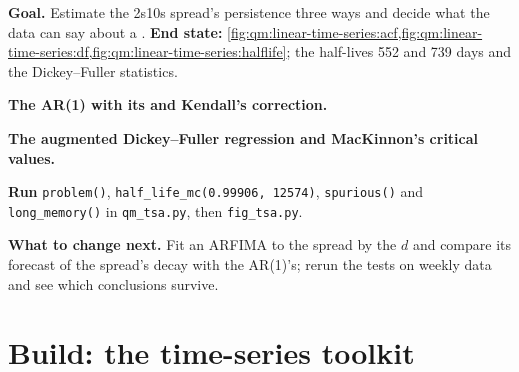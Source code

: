 \begin{tutorial}
\textbf{Goal.} Estimate the 2s10s spread's persistence three ways and decide what the data can say about a .
\textbf{End state:} \cref{fig:qm:linear-time-series:acf,fig:qm:linear-time-series:df,fig:qm:linear-time-series:halflife}; the half-lives 552 and 739 days and the
Dickey--Fuller statistics.
\begin{tutsteps}
\item \textbf{The AR(1) with its  and Kendall's correction.}
\label{lst:qm:linear-time-series:ar1}
\item \textbf{The augmented Dickey--Fuller regression and MacKinnon's critical values.}
\label{lst:qm:linear-time-series:adf}
\item \textbf{Run} \texttt{problem()}, \texttt{half\_life\_mc(0.99906, 12574)}, \texttt{spurious()} and \texttt{long\_memory()} in \texttt{qm\_tsa.py}, then
\texttt{fig\_tsa.py}.
\end{tutsteps}
\textbf{What to change next.} Fit an ARFIMA to the spread by the  $d$ and compare its forecast of the spread's decay with the AR(1)'s; rerun the
tests on weekly data and see which conclusions survive.
\end{tutorial}

\section{Build: the time-series toolkit}\label{bld:qm:linear-time-series:tsa}

